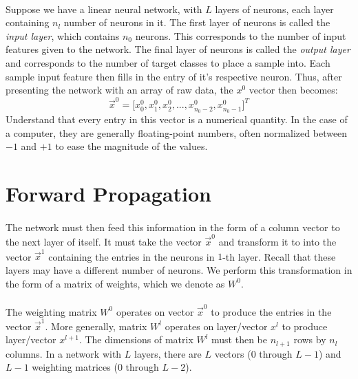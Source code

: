\documentclass[12pt,letterpaper]{article}
\begin{document}
\paragraph*{}Suppose we have a linear neural network, with $L$ layers of neurons, each layer containing $n_l$ number of neurons in it. The first layer of neurons is called the \textit{input layer}, which contains $n_0$ neurons. This corresponds to the number of input features given to the network. The final layer of neurons is called the \textit{output layer} and corresponds to the number of target classes to place a sample into. Each sample input feature then fills in the entry of it's respective neuron. Thus, after presenting the network with an array of raw data, the $x^0$ vector then becomes:
\begin{equation}
\label{layer0}
\vec{x}^0 = \big[ x^0_0 , x^0_1 , x^0_2 , ... , 
x^0_{n_0-2} , x^0_{n_0-1} \big]^T  
\end{equation} 
Understand that every entry in this vector is a numerical quantity. In the case of a computer, they are generally floating-point numbers, often normalized between $-1$ and $+1$ to ease the magnitude of the values. 


\section{Forward Propagation}
\paragraph*{}The network must then feed this information  in the form of a column vector to the next layer of itself. It must take the vector $\vec{x}^0$ and transform it to into the vector $\vec{x}^1$ containing the entries in the neurons in $1$-th layer. Recall that these layers may have a different number of neurons. We perform this transformation in the form of a matrix of weights, which we denote as $W^0$.
\paragraph*{}The weighting matrix $W^0$ operates on vector $\vec{x}^0$ to produce the entries in the vector $\vec{x}^1$. More generally, matrix $W^l$ operates on layer/vector $x^l$ to produce layer/vector $x^{l+1}$. The dimensions of matrix $W^l$ must then be $n_{l+1}$ rows by $n_l$ columns. In a network with $L$ layers, there are $L$ vectors ($0$ through $L-1$) and $L-1$ weighting matrices ($0$ through $L-2$).
\end{document}
